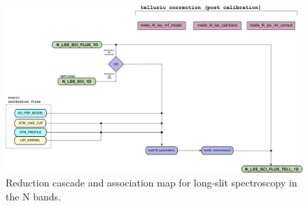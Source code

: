 \begin{figure}
  \centering
  \includegraphics[width=0.9\textheight]{figures/N_LSS_pipeline_wf_draft_latest_part_2_v0.82.png}
  \caption[Reduction cascade and association map for N long-slit
  spectroscopy]{Reduction cascade and association map for long-slit
    spectroscopy in the N bands. }
  \label{Fig:NLssAssomap2}
\end{figure}

